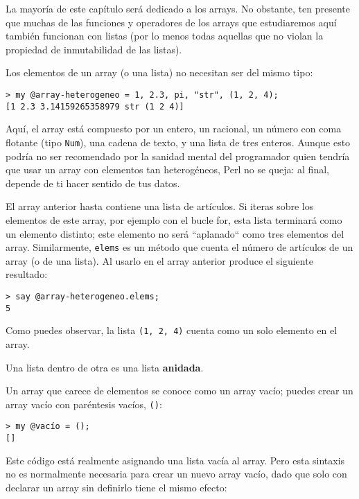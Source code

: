 La mayoría de este capítulo será dedicado a los arrays. No obstante,
ten presente que muchas de las funciones y operadores de los arrays
que estudiaremos aquí también funcionan con listas (por lo menos
todas aquellas que no violan la propiedad de inmutabilidad de las
listas). 

Los elementos de un array (o una lista) no necesitan ser del mismo
tipo:

\begin{lstlisting}
> my @array-heterogeneo = 1, 2.3, pi, "str", (1, 2, 4);
[1 2.3 3.14159265358979 str (1 2 4)]
\end{lstlisting}

Aquí, el array está compuesto por un entero, 
un racional, un número con coma flotante (tipo {\tt Num}),
una cadena de texto, y  una lista de tres enteros.
Aunque esto podría no ser recomendado por la sanidad mental
del programador quien tendría que usar un array con elementos
tan heterogéneos, Perl no se queja: al final, depende de ti hacer 
sentido de tus datos.

El array anterior hasta contiene una lista de artículos. 
Si iteras sobre los elementos de este array, por ejemplo con
el bucle for, esta lista terminará como un elemento distinto;
este elemento no será ``aplanado`` como tres elementos del
array. Similarmente, {\tt elems} es un método que cuenta el
número de artículos de un array (o de una lista). Al usarlo
en el array anterior produce el siguiente resultado:

\begin{lstlisting}
> say @array-heterogeneo.elems;
5
\end{lstlisting}
%

Como puedes observar, la lista \verb|(1, 2, 4)| cuenta como
un solo elemento en el array.

Una lista dentro de otra es una lista {\bf anidada}.

Un array que carece de elementos se conoce
como un array vacío; puedes crear un array vacío con
paréntesis vacíos, \verb|()|:

\begin{lstlisting}
> my @vacío = ();
[]
\end{lstlisting}

Este código está realmente asignando una lista vacía al array.
Pero esta sintaxis no es normalmente necesaria para crear un
nuevo array vacío, dado que solo con declarar un array sin 
definirlo tiene el mismo efecto:

